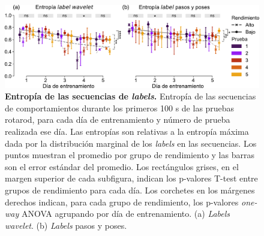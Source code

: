 \begin{figure}[htbp]
    \centering
    \includegraphics[width=0.99\linewidth]{figuras/capitulo4/entropia.pdf}
    \caption{\textbf{Entropía de las secuencias de \textit{labels}.}
        Entropía de las secuencias de comportamientos durante los primeros 100 s de las pruebas rotarod, para cada día de entrenamiento y número de prueba realizada ese día. Las entropías son relativas a la entropía máxima dada por la distribución marginal de los \textit{labels} en las secuencias. Los puntos muestran el promedio por grupo de rendimiento y las barras son el error estándar del promedio. Los rectángulos grises, en el margen superior de cada subfigura, indican los p-valores T-test entre grupos de rendimiento para cada día. Los corchetes en los márgenes derechos indican, para cada grupo de rendimiento, los p-valores \textit{one-way} ANOVA agrupando por día de entrenamiento. (a) \textit{Labels wavelet}. (b) \textit{Labels} pasos y poses.}
    \label{fig:capitulo4_entropia}
\end{figure}

